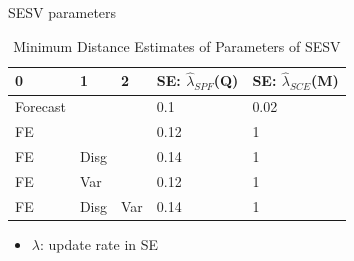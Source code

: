 \documentclass{beamer}
\begin{document}
\begin{frame}{SESV parameters}
	\begin{table}
		\centering
		\caption{Minimum Distance Estimates of Parameters of SESV}
		\label{GMM_Est_SE_SV_Table}
	\begin{tabular}{lllll}
		\hline 
		0        & 1    & 2   & SE: $\hat\lambda_{SPF}$(Q) & SE: $\hat\lambda_{SCE}$(M) \\
			\hline 
		Forecast &      &     & 0.1                        & 0.02                       \\
		FE       &      &     & 0.12                       & 1                          \\
		FE       & Disg &     & 0.14                       & 1                          \\
		FE       & Var  &     & 0.12                       & 1                          \\
		FE       & Disg & Var & 0.14                       & 1                         \\
			\hline 
	\end{tabular}
\begin{itemize}
	\item $\lambda$: update rate in SE
\end{itemize}
	\end{table}	
\end{frame}
\end{document}

